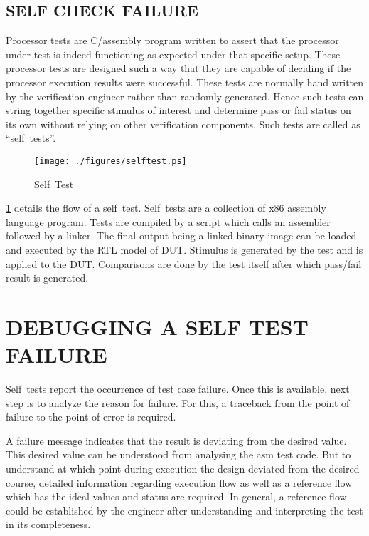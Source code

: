 \subsection {SELF CHECK FAILURE}

Processor tests are C/assembly program written to assert that the processor under test is indeed functioning as expected under that specific setup. These processor tests are designed such a way that they are capable of deciding if the processor execution results were successful. These tests are normally hand written by the verification engineer rather than randomly generated.  Hence such tests can string together specific stimulus of interest and determine pass or fail status on its own without relying on other verification components. Such tests are called as ``self~tests''.


\begin{figure}[h]
\centering
\texttt{[image: ./figures/selftest.ps]}
\caption{Self~Test} 
\label{fig:selftest.ps}
\end{figure}

\figurename {\ref{fig:selftest.ps}} details the flow of a self~test. Self~tests are a collection of x86 assembly language program. Tests are compiled by a script which calls an assembler followed by a linker. The final output being a linked binary image can be loaded and executed by the RTL model of DUT. Stimulus is generated by the test and is applied to the DUT. Comparisons are done by the test itself after which pass/fail result is generated.



\section{DEBUGGING A SELF TEST FAILURE}

Self~tests report the occurrence of test case failure. Once this is available, next step is to analyze the reason for failure.  For this, a traceback from the point of failure to the point of error is required. 

A failure message indicates that the result is deviating from the desired value. This desired value can be understood from analysing the asm test code. But to understand at which point during execution the design deviated from the desired course, detailed information regarding execution flow as well as a reference flow which has the ideal values and status are required. In general, a reference flow could be established by the engineer after understanding and interpreting the test in its completeness.
 
